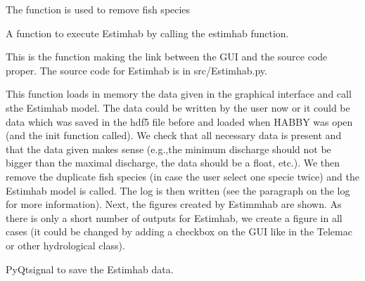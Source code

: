 \documentclass[letterpaper,10pt,english]{sphinxmanual}
\begin{document}
\begin{fulllineitems}
\begin{fulllineitems}
\label{\detokenize{index:src_GUI.estimhab_GUI.EstimhabW.remove_fish}}
The function is used to remove fish species

\end{fulllineitems}


\begin{fulllineitems}
\label{\detokenize{index:src_GUI.estimhab_GUI.EstimhabW.run_estmihab}}
A function to execute Estimhab by calling the estimhab function.


This is the function making the link between the GUI and the source code proper. The source code for Estimhab
is in src/Estimhab.py.

This function loads in memory the data given in the graphical interface and call sthe Estimhab model.
The data could be written by the user now or it could be data which was saved in the hdf5 file before and
loaded when HABBY was open (and the init function called).  We check that all necessary data is present and
that the data given makes sense (e.g.,the minimum discharge should not be bigger than the maximal discharge,
the data should be a float, etc.). We then remove the duplicate fish species (in case the user select one
specie twice) and the Estimhab model is called. The log is then written (see the paragraph on the log for more
information). Next, the figures created by Estimmhab are shown. As there is only a short number of outputs
for Estimhab, we create a figure in all cases (it could be changed by adding a checkbox on the GUI like
in the Telemac or other hydrological class).

\end{fulllineitems}


\begin{fulllineitems}
\label{\detokenize{index:src_GUI.estimhab_GUI.EstimhabW.save_signal_estimhab}}
PyQtsignal to save the Estimhab data.

\end{fulllineitems}



\end{fulllineitems}
\end{document}
